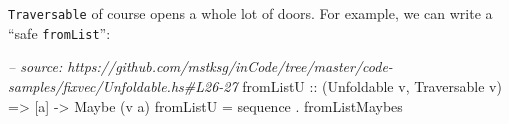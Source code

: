 \documentclass[]{article}
\newenvironment{Shaded}{}{}
\newcommand{\DataTypeTok}[1]{\textcolor[rgb]{0.56,0.13,0.00}{{#1}}}
\newcommand{\DecValTok}[1]{\textcolor[rgb]{0.25,0.63,0.44}{{#1}}}
\newcommand{\StringTok}[1]{\textcolor[rgb]{0.25,0.44,0.63}{{#1}}}
\newcommand{\CommentTok}[1]{\textcolor[rgb]{0.38,0.63,0.69}{\textit{{#1}}}}
\newcommand{\OtherTok}[1]{\textcolor[rgb]{0.00,0.44,0.13}{{#1}}}
\newcommand{\FunctionTok}[1]{\textcolor[rgb]{0.02,0.16,0.49}{{#1}}}
\newcommand{\NormalTok}[1]{{#1}}
\begin{document}
\begin{Shaded}
\end{Shaded}

\texttt{Traversable} of course opens a whole lot of doors. For example, we can
write a ``safe \texttt{fromList}'':

\begin{Shaded}
\begin{Highlighting}[]
\CommentTok{-- source: https://github.com/mstksg/inCode/tree/master/code-samples/fixvec/Unfoldable.hs#L26-27}
\OtherTok{fromListU ::} \NormalTok{(}\DataTypeTok{Unfoldable} \NormalTok{v, }\DataTypeTok{Traversable} \NormalTok{v) }\OtherTok{=>} \NormalTok{[a] }\OtherTok{->} \DataTypeTok{Maybe} \NormalTok{(v a)}
\NormalTok{fromListU }\FunctionTok{=} \NormalTok{sequence }\FunctionTok{.} \NormalTok{fromListMaybes}
\end{Highlighting}
\end{Shaded}
\end{document}

